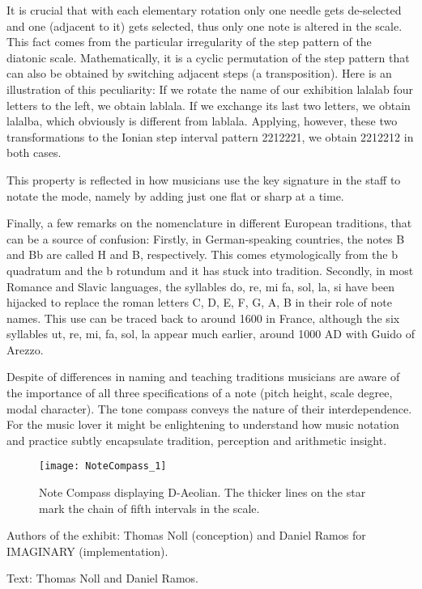 It is crucial that with each elementary rotation only one needle gets de-selected and one (adjacent to it) gets selected, thus only one note is altered in the scale. This fact comes from the particular irregularity of the step pattern of the diatonic scale. Mathematically, it is a cyclic permutation of the step pattern that can also be obtained by switching adjacent steps (a transposition). Here is an illustration of this peculiarity: If we rotate the name of our exhibition lalalab four letters to the left, we obtain lablala. If we exchange its last two letters, we obtain lalalba, which obviously is different from lablala. Applying, however, these two transformations to the Ionian step interval pattern 2212221, we obtain 2212212 in both cases.

This property is reflected in how musicians use the key signature in the staff to notate the mode, namely by adding just one flat or sharp at a time.

Finally, a few remarks on the nomenclature in different European traditions, that can be a source of confusion: Firstly, in German-speaking countries, the notes B and Bb are called H and B, respectively. This comes etymologically from the b quadratum and the b rotundum and it has stuck into tradition. Secondly, in most Romance and Slavic languages, the syllables do, re, mi fa, sol, la, si have been hijacked to replace the roman letters C, D, E, F, G, A, B in their role of note names. This use can be traced back to around 1600 in France, although the six syllables ut, re, mi, fa, sol, la appear much earlier, around 1000 AD with Guido of Arezzo.

Despite of differences in naming and teaching traditions musicians are aware of the importance of all three specifications of a note (pitch height, scale degree, modal character). The tone compass conveys the nature of their interdependence. For the music lover it might be enlightening to understand how music notation and practice subtly encapsulate tradition, perception and arithmetic insight.

\begin{figure}[hp]
\centering
\texttt{[image: NoteCompass\_1]}
\caption*{Note Compass displaying D-Aeolian. The thicker lines on the star mark the chain of fifth intervals in the scale.}
\end{figure}


\begin{sectcredits}
\item[Authors of the exhibit:] Thomas Noll (conception) and Daniel Ramos for IMAGINARY (implementation).
\item[Text:] Thomas Noll and Daniel Ramos.
\end{sectcredits}
